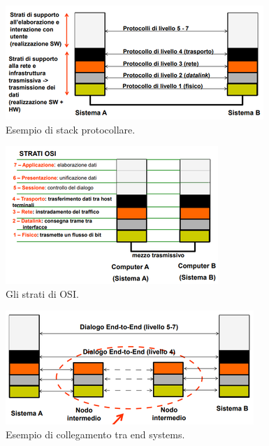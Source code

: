 \documentclass[11pt,a4paper]{article}
\theoremstyle{definition}
\begin{document}
\begin{figure}[!h]
	\includegraphics[scale=0.85]{Immagini/Protocol_stack.png}
	\centering
	\caption{Esempio di stack protocollare.}
\end{figure}
\begin{figure}[!h]
	\includegraphics[scale=0.75]{Immagini/Osi_strati.png}
	\centering
	\caption{Gli strati di OSI.}
\end{figure}
\begin{figure}[!h]
	\includegraphics[scale=0.75]{Immagini/End_sys.png}
	\centering
	\caption{Esempio di collegamento tra end systems.}
\end{figure}
\newpage
\end{document}
